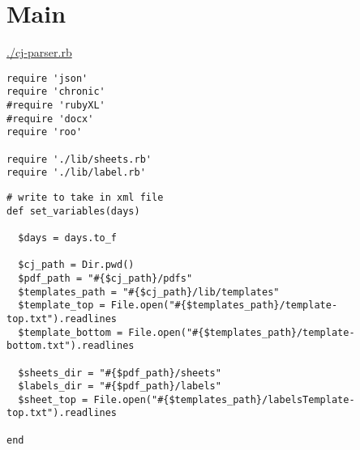 \documentclass[11pt]{article}
\begin{document}
\section{Main}
\label{sec-4}

\url{./cj-parser.rb}

\begin{verbatim}
require 'json'
require 'chronic'
#require 'rubyXL'
#require 'docx'
require 'roo'

require './lib/sheets.rb'
require './lib/label.rb'
\end{verbatim}

\begin{verbatim}
# write to take in xml file
def set_variables(days)

  $days = days.to_f

  $cj_path = Dir.pwd()
  $pdf_path = "#{$cj_path}/pdfs"
  $templates_path = "#{$cj_path}/lib/templates"
  $template_top = File.open("#{$templates_path}/template-top.txt").readlines
  $template_bottom = File.open("#{$templates_path}/template-bottom.txt").readlines

  $sheets_dir = "#{$pdf_path}/sheets"
  $labels_dir = "#{$pdf_path}/labels"
  $sheet_top = File.open("#{$templates_path}/labelsTemplate-top.txt").readlines

end
\end{verbatim}
\end{document}
